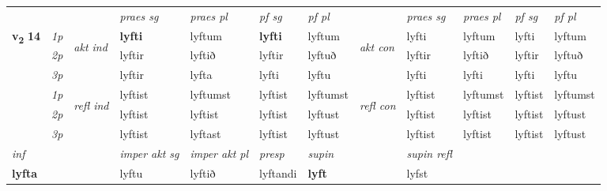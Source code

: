 \begin{longtable}[l]{X>{\footnotesize\itshape}llXXXXlXXXX}
 & &   & \textit{praes sg}  & \textit{praes pl}    & \textit{ pf sg} & \textit{pf pl} & & \textit{praes sg}  & \textit{praes pl}    & \textit{pf sg} & \textit{pf pl }  \\ \cmidrule{4-7} \cmidrule{9-12}
 \multirow{2}{*}{{{\textbf{v{\textsubscript{2}}} \Large{\textbf{14}}}}}  & 1p & \multirow{3}{*}{\begin{turn}{90}\textit{akt ind}\end{turn}} & \textbf{lyfti} & lyftum & \textbf{lyfti} & lyftum & \multirow{3}{*}{\begin{turn}{90}\textit{akt con}\end{turn}} &lyfti & lyftum & lyfti & lyftum\\*
 & 2p &  &  lyftir  & lyftið & lyftir & lyftuð & & lyftir & lyftið & lyftir & lyftuð \\*
 & 3p &  & lyftir & lyfta & lyfti & lyftu & & lyfti & lyfti& lyfti & lyftu \\*
\cmidrule{4-7} \cmidrule{9-12}
 & 1p & \multirow{3}{*}{\begin{turn}{90}\textit{refl ind}\end{turn}}  & lyftist & lyftumst & lyftist & lyftumst & \multirow{3}{*}{\begin{turn}{90}\textit{refl con}\end{turn}}  &lyftist & lyftumst & lyftist & lyftumst \\*
 & 2p &  & lyftist & lyftist & lyftist & lyftust & &lyftist & lyftist & lyftist & lyftust \\*
 & 3p  & & lyftist & lyftast & lyftist & lyftust & & lyftist & lyftist& lyftist & lyftust \\*
\cmidrule{4-7} \cmidrule{9-12}

   {\textit{inf}} & &  & \textit{imper akt sg} & \textit{imper akt pl}   & \textit{presp} & \textit{supin} && \textit{supin refl}  \\*
  {\textbf{lyfta}} & && lyftu  & lyftið   & lyftandi &  \textbf{lyft} && lyfst  \\*

\midrule


\end{longtable}
